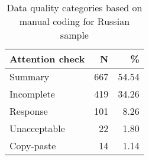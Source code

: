 \begin{table}

\caption{Data quality categories based on manual coding for Russian sample}
\centering
\begin{tabular}[t]{lrr}
\toprule
Attention check & N & \%\\
\midrule
Summary & 667 & \num{54.54}\\
Incomplete & 419 & \num{34.26}\\
Response & 101 & \num{8.26}\\
Unacceptable & 22 & \num{1.80}\\
Copy-paste & 14 & \num{1.14}\\
\bottomrule
\end{tabular}
\end{table}
